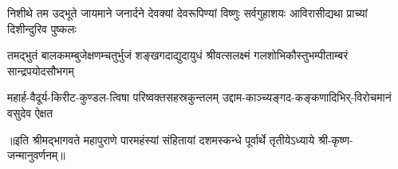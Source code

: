 
\addtocounter{shlokacount}{7}
\threelineshloka
{निशीथे तम उद्भूते जायमाने जनार्दने}
{देवक्यां देवरूपिण्यां विष्णुः सर्वगुहाशयः}
{आविरासीद्यथा प्राच्यां दिशीन्दुरिव पुष्कलः}

\fourlineindentedshloka
{तमद्भुतं बालकमम्बुजेक्षणम्}{चतुर्भुजं शङ्खगदाद्युदायुधं}
{श्रीवत्सलक्ष्मं गलशोभिकौस्तुभम्}{पीताम्बरं सान्द्रपयोदसौभगम्}


\fourlineindentedshloka
{महार्ह-वैदूर्य-किरीट-कुण्डल-}{त्विषा परिष्वक्तसहस्रकुन्तलम्}
{उद्दाम-काञ्च्यङ्गद-कङ्कणादिभिर्-}{विरोचमानं वसुदेव ऐक्षत}

॥इति श्रीमद्भागवते महापुराणे पारमहंस्यां संहितायां दशमस्कन्धे पूर्वार्थे तृतीयेऽध्याये श्री-कृष्ण-जन्मानुवर्णनम्॥
